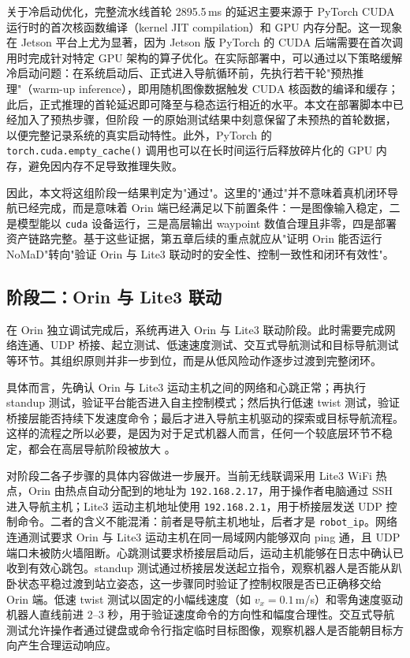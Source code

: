 关于冷启动优化，完整流水线首轮 2895.5\,ms 的延迟主要来源于 PyTorch CUDA 运行时的首次核函数编译（kernel JIT compilation）和
GPU 内存分配。这一现象在 Jetson 平台上尤为显著，因为 Jetson 版 PyTorch 的 CUDA 后端需要在首次调用时完成针对特定 GPU
架构的算子优化。在实际部署中，可以通过以下策略缓解冷启动问题：在系统启动后、正式进入导航循环前，先执行若干轮"预热推理"（warm-up
inference），即用随机图像数据触发 CUDA 核函数的编译和缓存；此后，正式推理的首轮延迟即可降至与稳态运行相近的水平。本文在部署脚本中已经加入了预热步骤，但阶段
一的原始测试结果中刻意保留了未预热的首轮数据，以便完整记录系统的真实启动特性。此外，PyTorch 的
\texttt{torch.cuda.empty\_cache()} 调用也可以在长时间运行后释放碎片化的 GPU 内存，避免因内存不足导致推理失败。

因此，本文将这组阶段一结果判定为"通过"。这里的"通过"并不意味着真机闭环导航已经完成，而是意味着 Orin 端已经满足以下前置条件：一是图像输入稳定，二是模型能以
\texttt{cuda} 设备运行，三是高层输出 waypoint 数值合理且非零，四是部署资产链路完整。基于这些证据，第五章后续的重点就应从"证明 Orin 能否运行
NoMaD"转向"验证 Orin 与 Lite3 联动时的安全性、控制一致性和闭环有效性"。

\subsection{阶段二：Orin 与 Lite3 联动}

在 Orin 独立调试完成后，系统再进入 Orin 与 Lite3 联动阶段。此时需要完成网络连通、UDP
桥接、起立测试、低速速度测试、交互式导航测试和目标导航测试等环节。其组织原则并非一步到位，而是从低风险动作逐步过渡到完整闭环。

具体而言，先确认 Orin 与 Lite3 运动主机之间的网络和心跳正常；再执行 standup 测试，验证平台能否进入自主控制模式；然后执行低速 twist 测试，验证
桥接层能否持续下发速度命令；最后才进入导航主机驱动的探索或目标导航流程。这样的流程之所以必要，是因为对于足式机器人而言，任何一个较底层环节不稳定，都会在高层导航阶段被放大
。

对阶段二各子步骤的具体内容做进一步展开。当前无线联调采用 Lite3 WiFi 热点，Orin 由热点自动分配到的地址为 \texttt{192.168.2.17}，用于操作者电脑通过 SSH 进入导航主机；Lite3 运动主机地址使用 \texttt{192.168.2.1}，用于桥接层发送 UDP 控制命令。二者的含义不能混淆：前者是导航主机地址，后者才是 \texttt{robot\_ip}。网络连通测试要求 Orin 与 Lite3 运动主机在同一局域网内能够双向 ping 通，且 UDP
端口未被防火墙阻断。心跳测试要求桥接层启动后，运动主机能够在日志中确认已收到有效心跳包。standup
测试通过桥接层发送起立指令，观察机器人是否能从趴卧状态平稳过渡到站立姿态，这一步骤同时验证了控制权限是否已正确移交给 Orin 端。低速 twist
测试以固定的小幅线速度（如 $v_x = 0.1$\,m/s）和零角速度驱动机器人直线前进 2--3
秒，用于验证速度命令的方向性和幅度合理性。交互式导航测试允许操作者通过键盘或命令行指定临时目标图像，观察机器人是否能朝目标方向产生合理运动响应。

